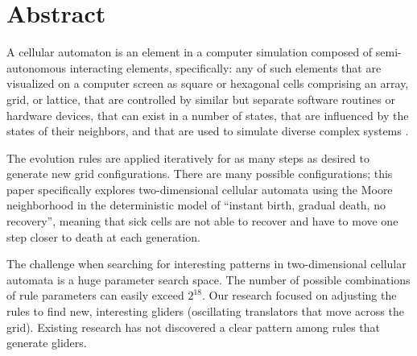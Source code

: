 \documentclass[12pt]{article}
\numberwithin{figure}{section} %
\begin{document}

\thispagestyle{plain}
\section*{\centering Abstract}

A cellular automaton is an element in a computer simulation composed of semi-autonomous interacting elements, specifically: any of such elements that are visualized on a computer screen as square or hexagonal cells comprising an array, grid, or lattice, that are controlled by similar but separate software routines or hardware devices, that can exist in a number of states, that are influenced by the states of their neighbors, and that are used to simulate diverse complex systems \cite{MW}. 

The evolution rules are applied iteratively for as many steps as desired to generate new grid configurations. There are many possible configurations; this paper specifically explores two-dimensional cellular automata using the Moore neighborhood in the deterministic model of “instant birth, gradual death, no recovery”, meaning that sick cells are not able to recover and have to move one step closer to death at each generation. 

The challenge when searching for interesting patterns in two-dimensional cellular automata is a huge parameter search space. The number of possible combinations of rule parameters can easily exceed $2^{18}$. Our research focused on adjusting the rules to find new, interesting gliders (oscillating translators that move across the grid). Existing research has not discovered a clear pattern among rules that generate gliders. 
\end{document}
